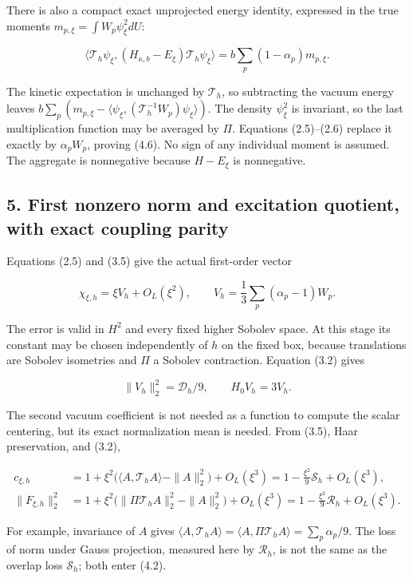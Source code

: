\documentclass[
  11pt,
]{article}
\begin{document}
There is also a compact exact unprojected energy identity, expressed in
the true moments \(m_{p,\xi}=\int W_p\psi_\xi^2dU\):

\[
\boxed{\langle\mathcal T_h\psi_\xi,
(H_{\kappa,b}-E_\xi)\mathcal T_h\psi_\xi\rangle
=b\sum_p(1-\alpha_p)m_{p,\xi}.}
\tag{4.6}
\]

The kinetic expectation is unchanged by \(\mathcal T_h\), so subtracting
the vacuum energy leaves \(b\sum_p(m_{p,\xi}-\langle\psi_\xi,
(\mathcal T_h^{-1}W_p)\psi_\xi\rangle)\). The density \(\psi_\xi^2\) is
invariant, so the last multiplication function may be averaged by
\(\Pi\). Equations (2.5)--(2.6) replace it exactly by \(\alpha_pW_p\),
proving (4.6). No sign of any individual moment is assumed. The
aggregate is nonnegative because \(H-E_\xi\) is nonnegative.

\subsection{5. First nonzero norm and excitation quotient, with exact
coupling
parity}\label{magnetic-part-2-first-nonzero-norm-and-excitation-quotient-with-exact-coupling-parity}

Equations (2.5) and (3.5) give the actual first-order vector

\[
\chi_{\xi,h}=\xi V_h+O_L(\xi^2),\qquad
V_h=\frac13\sum_p(\alpha_p-1)W_p.
\tag{5.1}
\]

The error is valid in \(H^2\) and every fixed higher Sobolev space. At
this stage its constant may be chosen independently of \(h\) on the
fixed box, because translations are Sobolev isometries and \(\Pi\) a
Sobolev contraction. Equation (3.2) gives

\[
\|V_h\|_2^2=\mathcal D_h/9,\qquad H_0V_h=3V_h.
\tag{5.2}
\]

The second vacuum coefficient is not needed as a function to compute the
scalar centering, but its exact normalization mean is needed. From
(3.5), Haar preservation, and (3.2),

\[
\begin{split}
c_{\xi,h}
&=1+\xi^2\big(\langle A,\mathcal T_hA\rangle-\|A\|_2^2\big)+O_L(\xi^3)
=1-\frac{\xi^2}{9}\mathcal S_h+O_L(\xi^3),\\
\|F_{\xi,h}\|_2^2
&=1+\xi^2\big(\|\Pi\mathcal T_hA\|_2^2-\|A\|_2^2\big)+O_L(\xi^3)
=1-\frac{\xi^2}{9}\mathcal R_h+O_L(\xi^3).
\end{split}
\tag{5.3}
\]

For example, invariance of \(A\) gives
\(\langle A,\mathcal T_hA\rangle=\langle A,\Pi\mathcal T_hA\rangle
=\sum_p\alpha_p/9\). The loss of norm under Gauss projection, measured
here by \(\mathcal R_h\), is not the same as the overlap loss
\(\mathcal S_h\); both enter (4.2).
\end{document}
